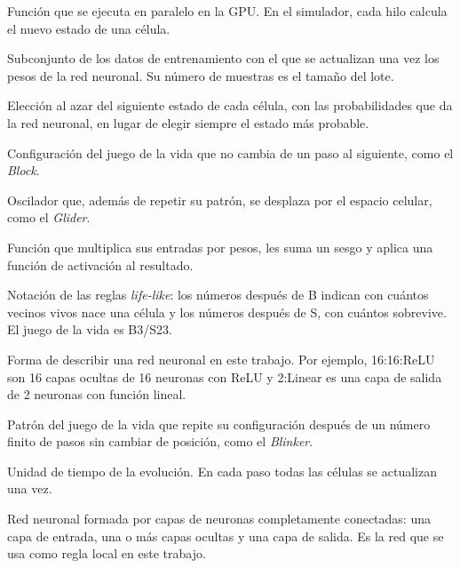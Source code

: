 \begin{description}[leftmargin=1.5em, labelindent=0pt, itemsep=4pt]
	\item[\textit{Kernel}] Función que se ejecuta en paralelo en la GPU. En el simulador, cada hilo calcula el nuevo estado de una célula.

	\item[Lote] Subconjunto de los datos de entrenamiento con el que se actualizan una vez los pesos de la red neuronal. Su número de muestras es el tamaño del lote.

	\item[Muestreo] Elección al azar del siguiente estado de cada célula, con las probabilidades que da la red neuronal, en lugar de elegir siempre el estado más probable.

	\item[Naturaleza muerta] Configuración del juego de la vida que no cambia de un paso al siguiente, como el \textit{Block}.

	\item[Nave espacial] Oscilador que, además de repetir su patrón, se desplaza por el espacio celular, como el \textit{Glider}.

	\item[Neurona artificial] Función que multiplica sus entradas por pesos, les suma un sesgo y aplica una función de activación al resultado.

	\item[Notación \textit{Birth/Survival}] Notación de las reglas \textit{life-like}: los números después de B indican con cuántos vecinos vivos nace una célula y los números después de S, con cuántos sobrevive. El juego de la vida es B3/S23.

	\item[Notación capas:neuronas:activación] Forma de describir una red neuronal en este trabajo. Por ejemplo, 16:16:ReLU son 16 capas ocultas de 16 neuronas con ReLU y 2:Linear es una capa de salida de 2 neuronas con función lineal.

	\item[Oscilador] Patrón del juego de la vida que repite su configuración después de un número finito de pasos sin cambiar de posición, como el \textit{Blinker}.

	\item[Paso] Unidad de tiempo de la evolución. En cada paso todas las células se actualizan una vez.

	\item[Perceptrón multicapa] Red neuronal formada por capas de neuronas completamente conectadas: una capa de entrada, una o más capas ocultas y una capa de salida. Es la red que se usa como regla local en este trabajo.


\end{description}
